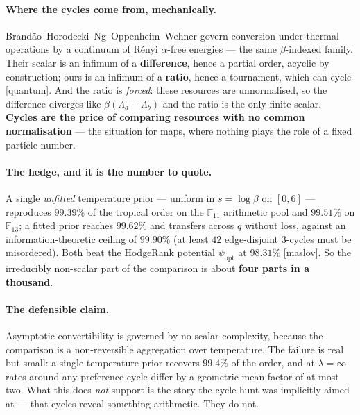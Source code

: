 \documentclass[11pt]{article}
\theoremstyle{plain}
\theoremstyle{remark}
\newcommand{\F}{\mathbb F}
\newcommand{\source}[1]{{\normalfont\small\textsf{[#1]}}}
\begin{document}
\paragraph{Where the cycles come from, mechanically.}
Brand\~ao--Horodecki--Ng--Oppenheim--Wehner govern conversion under thermal
operations by a continuum of R\'enyi $\alpha$-free energies --- the same
$\beta$-indexed family.  Their scalar is an infimum of a \textbf{difference},
hence a partial order, acyclic by construction; ours is an infimum of a
\textbf{ratio}, hence a tournament, which can cycle \source{quantum}.  And the
ratio is \emph{forced}: these resources are unnormalised, so the difference
diverges like $\beta(\Lambda_a - \Lambda_b)$ and the ratio is the only finite
scalar.  \textbf{Cycles are the price of comparing resources with no common
normalisation} --- the situation for maps, where nothing plays the role of a
fixed particle number.

\paragraph{The hedge, and it is the number to quote.}
A single \emph{unfitted} temperature prior --- uniform in $s = \log\beta$ on
$[0,6]$ --- reproduces $99.39\%$ of the tropical order on the $\F_{11}$
arithmetic pool and $99.51\%$ on $\F_{13}$; a fitted prior reaches $99.62\%$ and
transfers across $q$ without loss, against an information-theoretic ceiling of
$99.90\%$ (at least $42$ edge-disjoint $3$-cycles must be misordered).  Both
beat the HodgeRank potential $\psi_{\mathrm{opt}}$ at $98.31\%$
\source{maslov}.  So the irreducibly non-scalar part of the comparison is about
\textbf{four parts in a thousand}.

\paragraph{The defensible claim.}
Asymptotic convertibility is governed by no scalar complexity, because the
comparison is a non-reversible aggregation over temperature.  The failure is
real but small: a single temperature prior recovers $99.4\%$ of the order, and
at $\lambda = \infty$ rates around any preference cycle differ by a
geometric-mean factor of at most two.  What this does \emph{not} support is the
story the cycle hunt was implicitly aimed at --- that cycles reveal something
arithmetic.  They do not.
\end{document}
